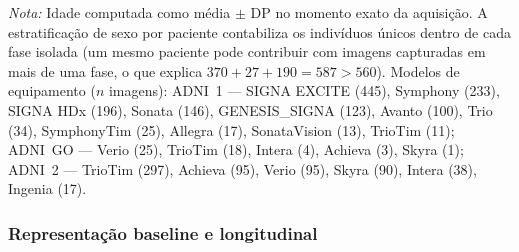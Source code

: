 \documentclass[review]{elsarticle}
\begin{document}
\begin{table}[htbp]
	\centering
	\footnotesize
	\caption{Demografia e dados técnicos das imagens T1w MP-RAGE (união sem repetições das quatro coortes de análise, considerando imagens únicas por identificador de aquisição).}
	\label{tab:adni_study}
	\begin{flushleft}
		\footnotesize
		\textit{Nota:} Idade computada como média $\pm$ DP no momento exato da aquisição. A estratificação de sexo por paciente contabiliza os indivíduos únicos dentro de cada fase isolada (um mesmo paciente pode contribuir com imagens capturadas em mais de uma fase, o que explica $370+27+190=587>560$).
		Modelos de equipamento ($n$ imagens): 
		ADNI~1 --- SIGNA EXCITE (445), Symphony (233), SIGNA HDx (196), Sonata (146), GENESIS\_SIGNA (123), Avanto (100), Trio (34), SymphonyTim (25), Allegra (17), SonataVision (13), TrioTim (11); 
		ADNI~GO --- Verio (25), TrioTim (18), Intera (4), Achieva (3), Skyra (1); 
		ADNI~2 --- TrioTim (297), Achieva (95), Verio (95), Skyra (90), Intera (38), Ingenia (17).
	\end{flushleft}
\end{table}

\subsubsection{Representação baseline e longitudinal}\label{subsubsec:longitudinal}
\end{document}
